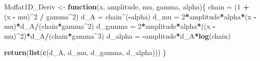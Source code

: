 \documentclass[
]{article}
\newenvironment{Shaded}{\begin{snugshade}}{\end{snugshade}}
\newcommand{\ControlFlowTok}[1]{\textcolor[rgb]{0.13,0.29,0.53}{\textbf{#1}}}
\newcommand{\DecValTok}[1]{\textcolor[rgb]{0.00,0.00,0.81}{#1}}
\newcommand{\FunctionTok}[1]{\textcolor[rgb]{0.13,0.29,0.53}{\textbf{#1}}}
\newcommand{\NormalTok}[1]{#1}
\newcommand{\OtherTok}[1]{\textcolor[rgb]{0.56,0.35,0.01}{#1}}
\newcommand{\SpecialCharTok}[1]{\textcolor[rgb]{0.81,0.36,0.00}{\textbf{#1}}}
\begin{document}
\begin{Shaded}
\begin{Highlighting}[]
\NormalTok{Moffat1D\_Deriv }\OtherTok{\textless{}{-}} \ControlFlowTok{function}\NormalTok{(x, amplitude, mu, gamma, alpha)\{}
\NormalTok{  chain }\OtherTok{=}\NormalTok{ (}\DecValTok{1} \SpecialCharTok{+}\NormalTok{ (x }\SpecialCharTok{{-}}\NormalTok{ mu)}\SpecialCharTok{\^{}}\DecValTok{2} \SpecialCharTok{/}\NormalTok{ gamma}\SpecialCharTok{\^{}}\DecValTok{2}\NormalTok{)}
\NormalTok{  d\_A }\OtherTok{=}\NormalTok{ chain}\SpecialCharTok{\^{}}\NormalTok{(}\SpecialCharTok{{-}}\NormalTok{alpha)}
\NormalTok{  d\_mu }\OtherTok{=} \DecValTok{2}\SpecialCharTok{*}\NormalTok{amplitude}\SpecialCharTok{*}\NormalTok{alpha}\SpecialCharTok{*}\NormalTok{(x }\SpecialCharTok{{-}}\NormalTok{ mu)}\SpecialCharTok{*}\NormalTok{d\_A}\SpecialCharTok{/}\NormalTok{(chain}\SpecialCharTok{*}\NormalTok{gamma}\SpecialCharTok{\^{}}\DecValTok{2}\NormalTok{)}
\NormalTok{  d\_gamma }\OtherTok{=} \DecValTok{2}\SpecialCharTok{*}\NormalTok{amplitude}\SpecialCharTok{*}\NormalTok{alpha}\SpecialCharTok{*}\NormalTok{((x }\SpecialCharTok{{-}}\NormalTok{ mu)}\SpecialCharTok{\^{}}\DecValTok{2}\NormalTok{)}\SpecialCharTok{*}\NormalTok{d\_A}\SpecialCharTok{/}\NormalTok{(chain}\SpecialCharTok{*}\NormalTok{gamma}\SpecialCharTok{\^{}}\DecValTok{3}\NormalTok{)}
\NormalTok{  d\_alpha }\OtherTok{=} \SpecialCharTok{{-}}\NormalTok{amplitude}\SpecialCharTok{*}\NormalTok{d\_A}\SpecialCharTok{*}\FunctionTok{log}\NormalTok{(chain)}
  
  \FunctionTok{return}\NormalTok{(}\FunctionTok{list}\NormalTok{(}\FunctionTok{c}\NormalTok{(d\_A, d\_mu, d\_gamma, d\_alpha)))}
\NormalTok{\}}
\end{Highlighting}
\end{Shaded}
\end{document}

